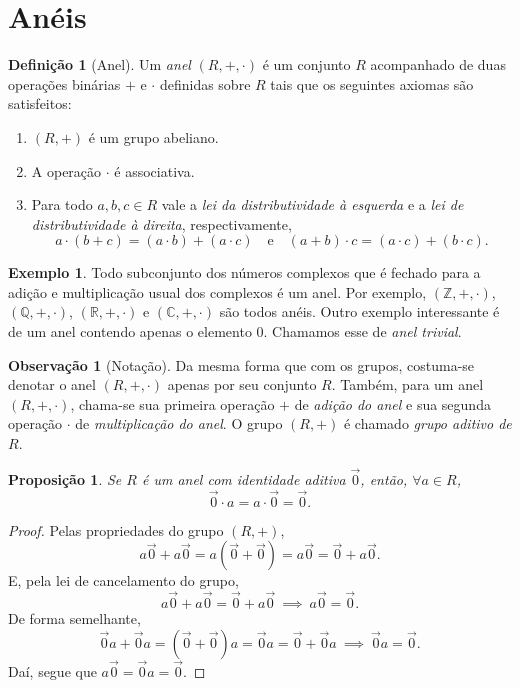 \documentclass[a4paper,12pt]{report}
\theoremstyle{plain}
\newtheorem{proposicao}{Proposição}[section]
\theoremstyle{definition}
\newtheorem{definicao}{Definição}[section]
\newtheorem{observacao}{Observação}[section]
\newtheorem{exemplo}{Exemplo}[section]
\begin{document}



\section{Anéis}

\begin{definicao}[Anel]
	Um \emph{anel} $(R, +, \cdot)$ é um conjunto $R$ acompanhado de duas operações binárias $+$ e $\cdot$ definidas sobre $R$ tais que os seguintes axiomas são satisfeitos:
	\begin{enumerate}
		\item $(R, +)$ é um grupo abeliano.
		\item A operação $\cdot$ é associativa.
		\item Para todo $a,b,c\in R$ vale a \emph{lei da distributividade à esquerda} e a \emph{lei de distributividade à direita}, respectivamente, $$a\cdot(b+c) = (a\cdot b) + (a\cdot c)\quad \text{e} \quad (a+b)\cdot c = (a\cdot c) + (b\cdot c).$$
	\end{enumerate}
\end{definicao}

\begin{exemplo}
	Todo subconjunto dos números complexos que é fechado para a adição e multiplicação usual dos complexos é um anel. Por exemplo, $(\mathbb{Z}, +, \cdot)$, $(\mathbb{Q}, +, \cdot)$, $(\mathbb{R}, +, \cdot)$ e $(\mathbb{C}, +, \cdot)$ são todos anéis.
	Outro exemplo interessante é de um anel contendo apenas o elemento $0$. Chamamos esse de \emph{anel trivial}.
\end{exemplo}

\begin{observacao}[Notação]
	Da mesma forma que com os grupos, costuma-se denotar o anel $(R, +, \cdot)$ apenas por seu conjunto $R$. Também, para um anel $(R, +, \cdot)$, chama-se sua primeira operação $+$ de \emph{adição do anel} e sua segunda operação $\cdot$ de \emph{multiplicação do anel}. O grupo $(R,+)$ é chamado \emph{grupo aditivo de $R$}.
\end{observacao}

\begin{proposicao}
	Se $R$ é um anel com identidade aditiva $\vec 0$, então, $\forall a \in R$, $$\vec 0 \cdot a = a \cdot \vec 0 = \vec 0.$$
\end{proposicao}
\begin{proof}
	Pelas propriedades do grupo $(R, +)$, $$a\vec 0 + a\vec 0 = a(\vec 0 + \vec 0) = a\vec 0 = \vec 0 + a\vec 0.$$ E, pela lei de cancelamento do grupo, $$a\vec0 + a\vec 0 = \vec 0 + a\vec 0 \ \implies \ a\vec 0 = \vec 0.$$
	De forma semelhante, $$\vec 0a + \vec 0a = (\vec 0 + \vec 0)a = \vec 0a = \vec 0 + \vec 0a \ \implies \ \vec 0a = \vec 0.$$ Daí, segue que $a\vec 0 = \vec 0a = \vec 0$. 
\end{proof}
\end{document}
